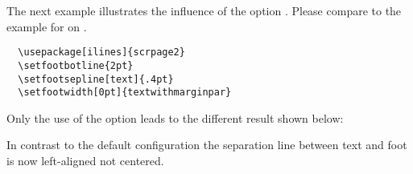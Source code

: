 \begin{Example}
  The next example illustrates the influence of the
  option . Please compare to the example for
   on .
\begin{lstlisting}
  \usepackage[ilines]{scrpage2}
  \setfootbotline{2pt}  
  \setfootsepline[text]{.4pt}
  \setfootwidth[0pt]{textwithmarginpar}
\end{lstlisting}

  Only the use of the option  leads to the different
  result shown below:
\begin{XmpBotPage}
        \thinlines{}
        \thicklines{}
\end{XmpBotPage}
  In contrast to the default configuration the separation line
  between text and foot is now left-aligned not centered.%
\end{Example}%
%


